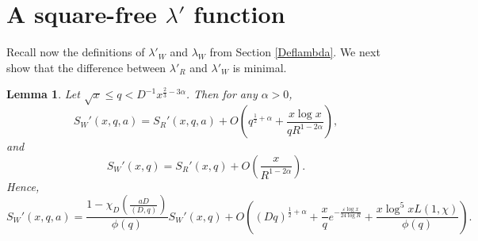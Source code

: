 \documentclass{amsart}
\newtheorem{lemma}[theorem]{Lemma}
\begin{document}
\section{A square-free $\lambda'$ function}\label{lambdaW}
Recall now the definitions of $\lambda'_W$ and $\lambda_W$ from Section \ref{Deflambda}.  We next show that the difference between $\lambda'_R$ and $\lambda'_W$ is minimal.
\begin{lemma}\label{DW}
Let $\sqrt x\leq q<D^{-1}x^{\frac 23-3\alpha}$.  Then for any $\alpha>0$,
$$S_W'(x,q,a)=S_R'(x,q,a)+O\left(q^{\frac 12+\alpha}+\frac{x\log x}{qR^{1-2\alpha}}\right),$$
and
$$S_W'(x,q)=S_R'(x,q)+O\left(\frac{x}{R^{1-2\alpha}}\right).$$
Hence,
$$S_W'(x,q,a)=\frac{1-\chi_D\left(\frac{aD}{(D,q)}\right)}{\phi(q)}S_W'(x,q)+O\left((Dq)^{\frac 12+\alpha}+\frac xqe^{-\frac{\varepsilon\log x}{24\log R}}+\frac{x\log^5 xL(1,\chi)}{\phi(q)}\right).$$

\end{lemma}
\end{document}
